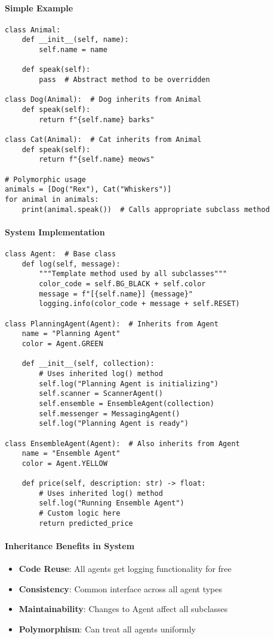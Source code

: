 \paragraph{Simple Example}
\begin{lstlisting}[caption=Basic Inheritance Example]
class Animal:
    def __init__(self, name):
        self.name = name
    
    def speak(self):
        pass  # Abstract method to be overridden

class Dog(Animal):  # Dog inherits from Animal
    def speak(self):
        return f"{self.name} barks"

class Cat(Animal):  # Cat inherits from Animal  
    def speak(self):
        return f"{self.name} meows"

# Polymorphic usage
animals = [Dog("Rex"), Cat("Whiskers")]
for animal in animals:
    print(animal.speak())  # Calls appropriate subclass method
\end{lstlisting}

\paragraph{System Implementation}
\begin{lstlisting}[caption=Agent Inheritance Hierarchy]
class Agent:  # Base class
    def log(self, message):
        """Template method used by all subclasses"""
        color_code = self.BG_BLACK + self.color
        message = f"[{self.name}] {message}"
        logging.info(color_code + message + self.RESET)

class PlanningAgent(Agent):  # Inherits from Agent
    name = "Planning Agent"
    color = Agent.GREEN
    
    def __init__(self, collection):
        # Uses inherited log() method
        self.log("Planning Agent is initializing")
        self.scanner = ScannerAgent()
        self.ensemble = EnsembleAgent(collection)
        self.messenger = MessagingAgent()
        self.log("Planning Agent is ready")

class EnsembleAgent(Agent):  # Also inherits from Agent
    name = "Ensemble Agent"
    color = Agent.YELLOW
    
    def price(self, description: str) -> float:
        # Uses inherited log() method
        self.log("Running Ensemble Agent")
        # Custom logic here
        return predicted_price
\end{lstlisting}

\paragraph{Inheritance Benefits in System}
\begin{itemize}
\item \textbf{Code Reuse}: All agents get logging functionality for free
\item \textbf{Consistency}: Common interface across all agent types
\item \textbf{Maintainability}: Changes to Agent affect all subclasses
\item \textbf{Polymorphism}: Can treat all agents uniformly
\end{itemize}

